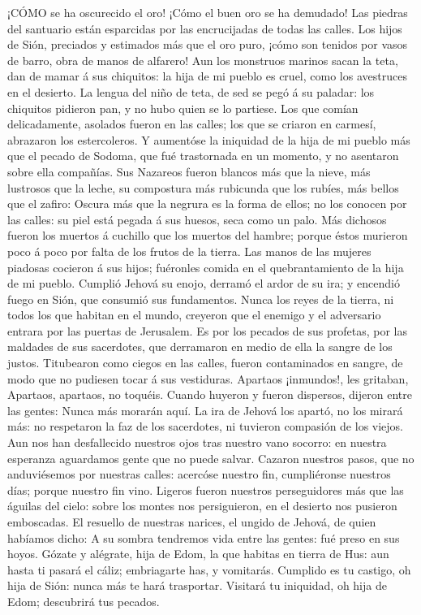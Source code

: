  ¡CÓMO se ha oscurecido el oro! ¡Cómo el buen oro se ha
demudado! Las piedras del santuario están esparcidas por las
encrucijadas de todas las calles.  Los hijos de Sión,
preciados y estimados más que el oro puro, ¡cómo son tenidos por vasos
de barro, obra de manos de alfarero!  Aun los monstruos
marinos sacan la teta, dan de mamar á sus chiquitos: la hija de mi
pueblo es cruel, como los avestruces en el desierto.  La
lengua del niño de teta, de sed se pegó á su paladar: los chiquitos
pidieron pan, y no hubo quien se lo partiese.  Los que
comían delicadamente, asolados fueron en las calles; los que se criaron
en carmesí, abrazaron los estercoleros.  Y aumentóse la
iniquidad de la hija de mi pueblo más que el pecado de Sodoma, que fué
trastornada en un momento, y no asentaron sobre ella compañías.
 Sus Nazareos fueron blancos más que la nieve, más lustrosos
que la leche, su compostura más rubicunda que los rubíes, más bellos que
el zafiro:  Oscura más que la negrura es la forma de ellos;
no los conocen por las calles: su piel está pegada á sus huesos, seca
como un palo.  Más dichosos fueron los muertos á cuchillo
que los muertos del hambre; porque éstos murieron poco á poco por falta
de los frutos de la tierra.  Las manos de las mujeres
piadosas cocieron á sus hijos; fuéronles comida en el quebrantamiento de
la hija de mi pueblo.  Cumplió Jehová su enojo, derramó el
ardor de su ira; y encendió fuego en Sión, que consumió sus fundamentos.
 Nunca los reyes de la tierra, ni todos los que habitan en
el mundo, creyeron que el enemigo y el adversario entrara por las
puertas de Jerusalem.  Es por los pecados de sus profetas,
por las maldades de sus sacerdotes, que derramaron en medio de ella la
sangre de los justos.  Titubearon como ciegos en las
calles, fueron contaminados en sangre, de modo que no pudiesen tocar á
sus vestiduras.  Apartaos ¡inmundos!, les gritaban,
Apartaos, apartaos, no toquéis. Cuando huyeron y fueron dispersos,
dijeron entre las gentes: Nunca más morarán aquí.  La ira
de Jehová los apartó, no los mirará más: no respetaron la faz de los
sacerdotes, ni tuvieron compasión de los viejos.  Aun nos
han desfallecido nuestros ojos tras nuestro vano socorro: en nuestra
esperanza aguardamos gente que no puede salvar.  Cazaron
nuestros pasos, que no anduviésemos por nuestras calles: acercóse
nuestro fin, cumpliéronse nuestros días; porque nuestro fin vino.
 Ligeros fueron nuestros perseguidores más que las águilas
del cielo: sobre los montes nos persiguieron, en el desierto nos
pusieron emboscadas.  El resuello de nuestras narices, el
ungido de Jehová, de quien habíamos dicho: A su sombra tendremos vida
entre las gentes: fué preso en sus hoyos.  Gózate y
alégrate, hija de Edom, la que habitas en tierra de Hus: aun hasta ti
pasará el cáliz; embriagarte has, y vomitarás.  Cumplido es
tu castigo, oh hija de Sión: nunca más te hará trasportar. Visitará tu
iniquidad, oh hija de Edom; descubrirá tus pecados.

